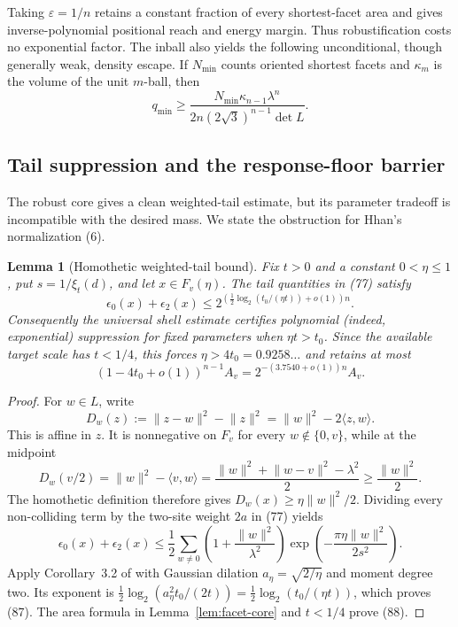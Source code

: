 \documentclass[10pt]{article}
\newtheorem{lemma}[theorem]{Lemma}
\theoremstyle{definition}
\newcommand{\ip}[2]{\langle #1,#2\rangle}
\newcommand{\norm}[1]{\lVert #1\rVert}
\begin{document}
Taking $\varepsilon=1/n$ retains a constant fraction of every shortest-facet
area and gives inverse-polynomial positional reach and energy margin.  Thus
robustification costs no exponential factor.  The inball also yields the
following unconditional, though generally weak, density escape.  If
$N_{\min}$ counts oriented shortest facets and $\kappa_m$ is the volume of
the unit $m$-ball, then
\[
 q_{\min}\ge
 \frac{N_{\min}\kappa_{n-1}\lambda^n}
      {2n(2\sqrt3)^{n-1}\det L}.                               \tag{86}
\]

\subsection{Tail suppression and the response-floor barrier}

The robust core gives a clean weighted-tail estimate, but its parameter
tradeoff is incompatible with the desired mass.  We state the obstruction
for Hhan's normalization (6).

\begin{lemma}[Homothetic weighted-tail bound]                  \label{lem:tail-bound}
Fix $t>0$ and a constant $0<\eta\le1$, put $s=1/\xi_t(d)$, and
let $x\in F_v(\eta)$.  The tail quantities in (77) satisfy
\[
 \epsilon_0(x)+\epsilon_2(x)
 \le 2^{(\frac12\log_2(t_0/(\eta t))+o(1))n}.                 \tag{87}
\]
Consequently the universal shell estimate certifies polynomial (indeed,
exponential) suppression for fixed parameters when $\eta t>t_0$.  Since the
available target scale has $t<1/4$, this forces $\eta>4t_0=0.9258\ldots$ and
retains at most
\[
 (1-4t_0+o(1))^{n-1}A_v
   =2^{-(3.7540+o(1))n}A_v.                                   \tag{88}
\]
\end{lemma}

\begin{proof}
For $w\in L$, write
\[
 D_w(z):=\norm{z-w}^2-\norm z^2=\norm w^2-2\ip zw.
\]
This is affine in $z$.  It is nonnegative on $F_v$ for every
$w\notin\{0,v\}$, while at the midpoint
\[
 D_w(v/2)=\norm w^2-\ip vw
 =\frac{\norm w^2+\norm{w-v}^2-\lambda^2}{2}
 \ge\frac{\norm w^2}{2}.
\]
The homothetic definition therefore gives
$D_w(x)\ge\eta\norm w^2/2$.  Dividing every non-colliding term by the two-site
weight $2a$ in (77) yields
\[
 \epsilon_0(x)+\epsilon_2(x)
 \le\frac12\sum_{w\ne0}
 \left(1+\frac{\norm w^2}{\lambda^2}\right)
 \exp\left(-\frac{\pi\eta\norm w^2}{2s^2}\right).
\]
Apply Corollary~3.2 of \cite{Hhan26} with Gaussian dilation
$a_\eta=\sqrt{2/\eta}$ and moment degree two.  Its exponent is
$\frac12\log_2(a_\eta^2t_0/(2t))=\frac12\log_2(t_0/(\eta t))$,
which proves (87).  The area formula in Lemma~\ref{lem:facet-core} and
$t<1/4$ prove (88).
\end{proof}
\end{document}
